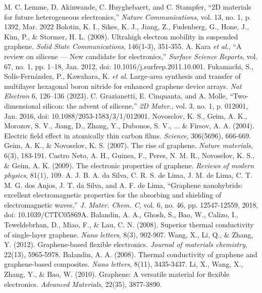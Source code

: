 \documentclass[conference]{IEEEtran}
\begin{document}
\begin{thebibliography}{00}
   M. C. Lemme, D. Akinwande, C. Huyghebaert, and C. Stampfer, ``2D materials for future heterogeneous electronics,'' \textit{Nature Communications}, vol. 13, no. 1, p. 1392, Mar. 2022
   Bolotin, K. I., Sikes, K. J., Jiang, Z., Fudenberg, G., Hone, J., Kim, P., \& Stormer, H. L. (2008). Ultrahigh electron mobility in suspended graphene. \textit{Solid State Communications}, 146(1-3), 351-355.
   A. Kara \textit{et al}., ``A review on silicene — New candidate for electronics,'' \textit{Surface Science Reports}, vol. 67, no. 1, pp. 1–18, Jan. 2012, doi: 10.1016/j.surfrep.2011.10.001.
   Fukamachi, S., Sol\'is-Fern\'andez, P., Kawahara, K. \textit{et al}. Large-area synthesis and transfer of multilayer hexagonal boron nitride for enhanced graphene device arrays. \textit{Nat Electron} 6, 126–136 (2023).
   C. Grazianetti, E. Cinquanta, and A. Molle, ``Two-dimensional silicon: the advent of silicene,'' \textit{2D Mater}., vol. 3, no. 1, p. 012001, Jan. 2016, doi: 10.1088/2053-1583/3/1/012001.
   Novoselov, K. S., Geim, A. K., Morozov, S. V., Jiang, D., Zhang, Y., Dubonos, S. V., ... \& Firsov, A. A. (2004). Electric field effect in atomically thin carbon films. \textit{Science}, 306(5696), 666-669.
   Geim, A. K., \& Novoselov, K. S. (2007). The rise of graphene. \textit{Nature materials}, 6(3), 183-191.
   Castro Neto, A. H., Guinea, F., Peres, N. M. R., Novoselov, K. S., \& Geim, A. K. (2009). The electronic properties of graphene. \textit{Reviews of modern physics}, 81(1), 109.
   A. J. B. A. da Silva, C. R. S. de Lima, J. M. de Lima, C. T. M. G. dos Anjos, J. T. da Silva, and A. F. de Lima, ``Graphene nanohybrids: excellent electromagnetic properties for the absorbing and shielding of electromagnetic waves,'' \textit{J. Mater. Chem. C}, vol. 6, no. 46, pp. 12547-12559, 2018, doi: 10.1039/C7TC05869A.
   Balandin, A. A., Ghosh, S., Bao, W., Calizo, I., Teweldebrhan, D., Miao, F., \& Lau, C. N. (2008). Superior thermal conductivity of single-layer graphene. \textit{Nano letters}, 8(3), 902-907.
   Wang, X., Li, Q., \& Zhang, Y. (2012). Graphene-based flexible electronics. \textit{Journal of materials chemistry}, 22(13), 5965-5978.
   Balandin, A. A. (2008). Thermal conductivity of graphene and graphene-based composites. \textit{Nano letters}, 8(11), 3435-3437.
   Li, X., Wang, X., Zhang, Y., \& Bao, W. (2010). Graphene: A versatile material for flexible electronics. \textit{Advanced Materials}, 22(35), 3877-3890.

\end{thebibliography}
\end{document}
